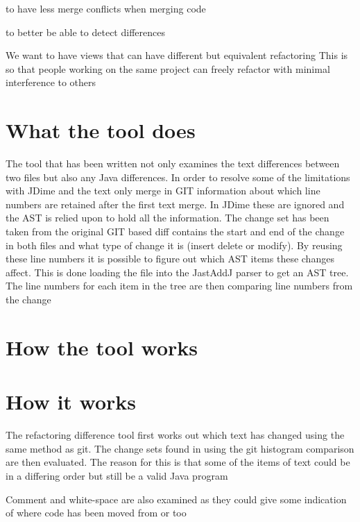 

to have less merge conflicts when merging code 

to better be able to detect differences

We want to have views that can have different but equivalent refactoring
This is so that people working on the same project can freely refactor with minimal interference to others

\section{What the tool does}
The tool that has been written not only examines the text differences between two files but also any Java differences. In order to resolve some of the limitations with JDime and the text only merge in GIT information about which line numbers are retained after the first text merge.  In JDime these are ignored and the AST is relied upon to hold all the information.  The change set has been taken from the original GIT based diff contains the start and end of the change in both files and what type of change it is (insert delete or modify).  By reusing these line numbers it is possible to figure out which AST items these changes affect. This is done loading the file into the JastAddJ parser to get an AST tree. The line numbers for each item in the tree are then comparing line numbers from the change

% 
\section{How the tool works}
\section{How it works}

The refactoring difference tool first works out which text has changed using the same method as git.
The change sets found in using the git histogram comparison are then evaluated.
The reason for this is that some of the items of text could be in a differing order but still be a valid Java program

Comment and white-space are also examined as they could give some indication of where code has been moved from or too

